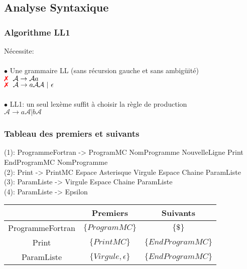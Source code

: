 \subsection{Analyse Syntaxique}

\begin{frame}
    
\end{frame}

\begin{frame}
    \frametitle{Algorithme LL1\esp}

    Nécessite:\\
    \vspace{0.05cm}\\{
    $\bullet$ Une grammaire LL (sans récursion gauche et sans ambigüité)\\
    $\text{\textcolor{red}{\ding{55}}} \ \ \mathcal{A} \rightarrow \mathcal{A}a$\\
    $\text{\textcolor{red}{\ding{55}}} \ \  \mathcal{A} \rightarrow a\mathcal{A}\mathcal{A} \ | \ \epsilon $\\}
    \vspace{0.25cm}\\
    {
    $\bullet$ LL1: un seul lexème suffit à choisir la règle de production\\
    $\mathcal{A} \rightarrow a\mathcal{A} | b\mathcal{A} $
}


\end{frame}

\begin{frame}
    \frametitle{Tableau des premiers et suivants\esp}
    (1): ProgrammeFortran -> ProgramMC NomProgramme NouvelleLigne Print EndProgramMC NomProgramme\\
    (2): Print -> PrintMC Espace Asterisque Virgule Espace Chaine ParamListe\\
    (3): ParamListe -> Virgule Espace Chaine ParamListe\\
    (4): ParamListe ->  Epsilon \\

    \begin{tabular}{|c|c|c|}
    \hline
        & Premiers & Suivants\\  
    \hline
    ProgrammeFortran & $\{ProgramMC\}$ & $\{\$\}$ \\
    \hline
    Print & $\{PrintMC\}$ & $\{EndProgramMC\}$ \\
    \hline
    ParamListe & $\{ Virgule, \epsilon \}$ & $\{EndProgramMC\}$\\
    \hline

    \end{tabular}

\end{frame}

